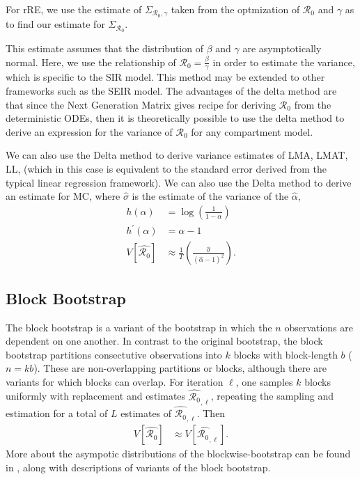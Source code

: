 \documentclass[12pt]{article}
\newcommand{\rr}{\ensuremath{\mathcal{R}_0}}
\begin{document}
For rRE, we use the estimate of $\Sigma_{\rr, \gamma}$ taken from the optmization of $\rr$ and $\gamma$ as to find our estimate for $\hat{\Sigma}_{\rr}$.

This estimate assumes that the distribution of $\beta$ and $\gamma$ are asymptotically normal.  Here, we use the relationship of $\rr = \frac{\beta}{\gamma}$ in order to estimate the variance, which is specific to the SIR model.  This method may be extended to other frameworks such as the SEIR model.  The advantages of the delta method are that since the Next Generation Matrix \citep{diekmann2009} gives recipe for deriving $\rr$ from the deterministic ODEs, then it is theoretically possible to use the delta method to derive an expression for the variance of $\rr$ for any compartment model.

We can also use the Delta method to derive variance estimates of LMA, LMAT, LL, (which in this case is equivalent to the standard error derived from the typical linear regression framework).  We can also use the Delta method to derive an estimate for MC, where $\hat{\sigma}$ is the estimate of the variance of the $\hat{\alpha}$,
\begin{align*}
h(\alpha) &= \log \left ( \frac{1}{1-\alpha}\right ) \\
  h^\prime(\alpha) &= \alpha - 1 \\
                     V[ \hat{\rr} ] & \approx \frac{1}{T}  \left (\frac{\hat{\sigma}}{(\hat{\alpha} - 1)^2} \right ).
\end{align*}

\subsection{Block Bootstrap}

The block bootstrap is a variant of the bootstrap in which the $n$ observations are dependent on one another.  In contrast to the original bootstrap, the block bootstrap partitions consectutive observations into $k$ blocks with block-length $b$ ($n=kb$).  These are non-overlapping partitions or blocks, although there are variants for which blocks can overlap.  For iteration $\ell$, one samples $k$ blocks uniformly with replacement and estimates $\hat{\rr}_{,\ell}$, repeating the sampling and estimation for a total of $L$ estimates of $\hat{\rr}_{,\ell}$.  Then
\begin{align*}
  V\left [ \hat{\rr} \right ] &\approx V\left [\hat{\rr}_{,\ell} \right ].
\end{align*}
More about the asympotic distributions of the blockwise-bootstrap can be found in \cite{cao1999}, along with descriptions of variants of the block bootstrap.
\end{document}
